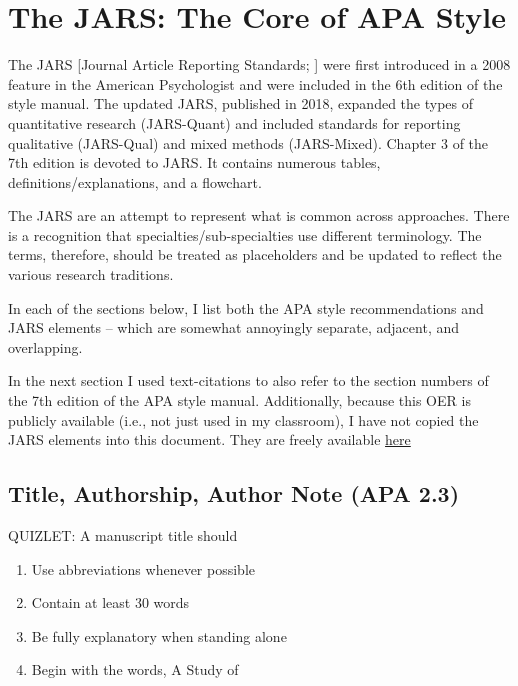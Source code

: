 \documentclass[
  11pt,
]{book}
\providecommand{\tightlist}{%
  \setlength{\itemsep}{0pt}\setlength{\parskip}{0pt}}
\begin{document}
\hypertarget{the-jars-the-core-of-apa-style}{%
\section{The JARS: The Core of APA Style}\label{the-jars-the-core-of-apa-style}}

The JARS {[}Journal Article Reporting Standards; \citet{appelbaum_journal_2018}{]} were first introduced in a 2008 feature in the American Psychologist \citep{noauthor_reporting_2008} and were included in the 6th edition of the style manual. The updated JARS, published in 2018, expanded the types of quantitative research (JARS-Quant) and included standards for reporting qualitative (JARS-Qual) and mixed methods (JARS-Mixed). Chapter 3 of the 7th edition is devoted to JARS. It contains numerous tables, definitions/explanations, and a flowchart.

The JARS are an attempt to represent what is common across approaches. There is a recognition that specialties/sub-specialties use different terminology. The terms, therefore, should be treated as placeholders and be updated to reflect the various research traditions.

In each of the sections below, I list both the APA style recommendations and JARS elements -- which are somewhat annoyingly separate, adjacent, and overlapping.

In the next section I used text-citations to also refer to the section numbers of the 7th edition of the APA style manual. Additionally, because this OER is publicly available (i.e., not just used in my classroom), I have not copied the JARS elements into this document. They are freely available \href{https://apastyle.apa.org/jars/quantitative}{here}

\hypertarget{title-authorship-author-note-apa-2.3}{%
\subsection{Title, Authorship, Author Note (APA 2.3)}\label{title-authorship-author-note-apa-2.3}}

QUIZLET:
A manuscript title should

\begin{enumerate}
\def\labelenumi{\alph{enumi}.}
\tightlist
\item
  Use abbreviations whenever possible
\item
  Contain at least 30 words
\item
  Be fully explanatory when standing alone
\item
  Begin with the words, A Study of
\end{enumerate}
\end{document}
